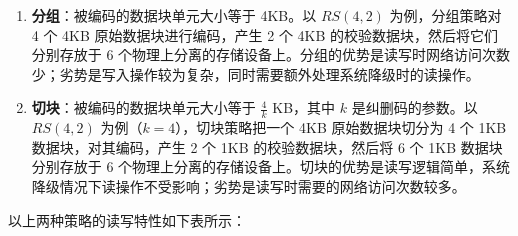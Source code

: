 \begin{enumerate}[(1)]
    
    \item \textbf{分组}：被编码的数据块单元大小等于 4KB。以 $RS(4, 2)$ 为例，分组策略对 4 个 4KB 原始数据块进行编码，产生 2 个 4KB 的校验数据块，然后将它们分别存放于 6 个物理上分离的存储设备上。分组的优势是读写时网络访问次数少；劣势是写入操作较为复杂，同时需要额外处理系统降级时的读操作。

    \item \textbf{切块}：被编码的数据块单元大小等于 $\frac{4}{k}$ KB，其中 $k$ 是纠删码的参数。以 $RS(4, 2)$ 为例（$k = 4$），切块策略把一个 4KB 原始数据块切分为 4 个 1KB 数据块，对其编码，产生 2 个 1KB 的校验数据块，然后将 6 个 1KB 数据块分别存放于 6 个物理上分离的存储设备上。切块的优势是读写逻辑简单，系统降级情况下读操作不受影响；劣势是读写时需要的网络访问次数较多。

\end{enumerate}

以上两种策略的读写特性如下表所示：


